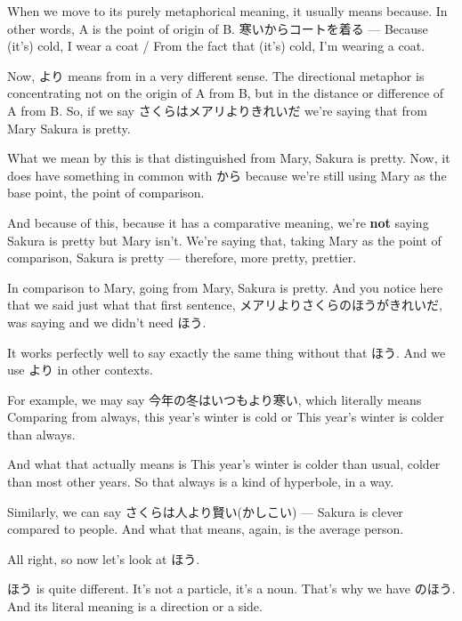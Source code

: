 When we move to its purely metaphorical meaning, it usually means because. In other words, A is the point of origin of B. 寒いからコートを着る --- Because (it's) cold, I wear a coat / From the fact that (it's) cold, I'm wearing a coat.

Now, より means from in a very different sense. The directional metaphor is concentrating not on the origin of A from B, but in the distance or difference of A from B. So, if we say さくらはメアリよりきれいだ we're saying that from Mary Sakura is pretty.

{}

What we mean by this is that distinguished from Mary, Sakura is pretty. Now, it does have something in common with から because we're still using Mary as the base point, the point of comparison.

And because of this, because it has a comparative meaning, we're {\bf not} saying Sakura is pretty but Mary isn't. We're saying that, taking Mary as the point of comparison, Sakura is pretty --- therefore, more pretty, prettier.

In comparison to Mary, going from Mary, Sakura is pretty. And you notice here that we said just what that first sentence, メアリよりさくらのほうがきれいだ, was saying and we didn't need ほう.

It works perfectly well to say exactly the same thing without that ほう. And we use より in other contexts.

For example, we may say 今年の冬はいつもより寒い, which literally means Comparing from always, this year's winter is cold or This year's winter is colder than always.

{}

And what that actually means is This year's winter is colder than usual, colder than most other years. So that always is a kind of hyperbole, in a way.

Similarly, we can say さくらは人より賢い(かしこい) --- Sakura is clever compared to people. And what that means, again, is  the average person.

All right, so now let's look at ほう.

\stopsectionlevel

\startsectionlevel[title={ほう},reference={ほう}]

ほう is quite different. It's not a particle, it's a noun. That's why we have のほう. And its literal meaning is a direction or a side.


